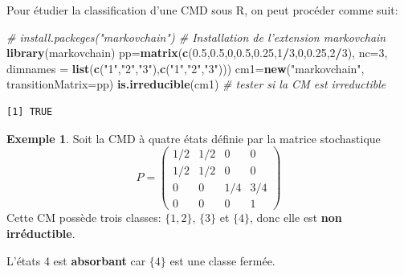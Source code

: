 \documentclass[
]{book}
\newenvironment{Shaded}{\begin{snugshade}}{\end{snugshade}}
\newcommand{\CommentTok}[1]{\textcolor[rgb]{0.56,0.35,0.01}{\textit{#1}}}
\newcommand{\DataTypeTok}[1]{\textcolor[rgb]{0.13,0.29,0.53}{#1}}
\newcommand{\DecValTok}[1]{\textcolor[rgb]{0.00,0.00,0.81}{#1}}
\newcommand{\FloatTok}[1]{\textcolor[rgb]{0.00,0.00,0.81}{#1}}
\newcommand{\KeywordTok}[1]{\textcolor[rgb]{0.13,0.29,0.53}{\textbf{#1}}}
\newcommand{\NormalTok}[1]{#1}
\newcommand{\OperatorTok}[1]{\textcolor[rgb]{0.81,0.36,0.00}{\textbf{#1}}}
\newcommand{\StringTok}[1]{\textcolor[rgb]{0.31,0.60,0.02}{#1}}
\theoremstyle{definition}
\theoremstyle{definition}
\newtheorem{example}{Exemple}[chapter]
\theoremstyle{definition}
\theoremstyle{remark}
\begin{document}
Pour étudier la classification d'une CMD sous R, on peut procéder comme suit:

\begin{Shaded}
\begin{Highlighting}[]
\CommentTok{# install.packeges("markovchain")   # Installation de l'extension markovchain}
\KeywordTok{library}\NormalTok{(markovchain)}
\NormalTok{pp=}\KeywordTok{matrix}\NormalTok{(}\KeywordTok{c}\NormalTok{(}\FloatTok{0.5}\NormalTok{,}\FloatTok{0.5}\NormalTok{,}\DecValTok{0}\NormalTok{,}\FloatTok{0.5}\NormalTok{,}\FloatTok{0.25}\NormalTok{,}\DecValTok{1}\OperatorTok{/}\DecValTok{3}\NormalTok{,}\DecValTok{0}\NormalTok{,}\FloatTok{0.25}\NormalTok{,}\DecValTok{2}\OperatorTok{/}\DecValTok{3}\NormalTok{), }\DataTypeTok{nc=}\DecValTok{3}\NormalTok{, }
          \DataTypeTok{dimnames =} \KeywordTok{list}\NormalTok{(}\KeywordTok{c}\NormalTok{(}\StringTok{"1"}\NormalTok{,}\StringTok{"2"}\NormalTok{,}\StringTok{"3"}\NormalTok{),}\KeywordTok{c}\NormalTok{(}\StringTok{"1"}\NormalTok{,}\StringTok{"2"}\NormalTok{,}\StringTok{"3"}\NormalTok{)))}
\NormalTok{cm1=}\KeywordTok{new}\NormalTok{(}\StringTok{"markovchain"}\NormalTok{, }\DataTypeTok{transitionMatrix=}\NormalTok{pp)}
\KeywordTok{is.irreducible}\NormalTok{(cm1)  }\CommentTok{# tester si la CM est irreductible}
\end{Highlighting}
\end{Shaded}

\begin{verbatim}
[1] TRUE
\end{verbatim}

\begin{example}
\protect\hypertarget{exm:unnamed-chunk-66}{}{\label{exm:unnamed-chunk-66} }Soit la CMD à quatre états définie par la matrice stochastique
\[
  P=\left( 
    \begin{array}{cccc}
    1/2 & 1/2 & 0 &0\\
    1/2 & 1/2 & 0 & 0 \\
   0& 0 & 1/4 & 3/4\\
    0 & 0 & 0 & 1
    \end{array}
    \right)
\]
Cette CM possède trois classes: \(\{1,2\}\), \(\{3\}\) et \(\{4\}\), donc elle est \textbf{non irréductible}.

L'états 4 est \textbf{absorbant} car \(\{4\}\) est une classe fermée.
\end{example}
\end{document}
